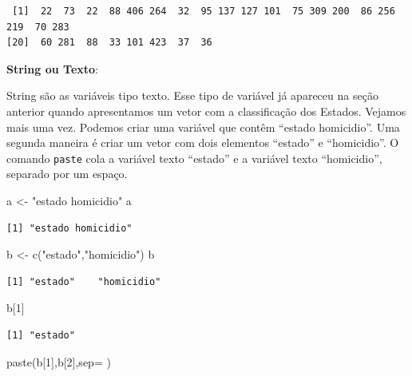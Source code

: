 \documentclass[
  letterpaper,
  DIV=11,
  numbers=noendperiod]{scrreprt}
\newenvironment{Shaded}{\begin{snugshade}}{\end{snugshade}}
\newcommand{\AttributeTok}[1]{\textcolor[rgb]{0.40,0.45,0.13}{#1}}
\newcommand{\DecValTok}[1]{\textcolor[rgb]{0.68,0.00,0.00}{#1}}
\newcommand{\FunctionTok}[1]{\textcolor[rgb]{0.28,0.35,0.67}{#1}}
\newcommand{\NormalTok}[1]{\textcolor[rgb]{0.00,0.23,0.31}{#1}}
\newcommand{\OtherTok}[1]{\textcolor[rgb]{0.00,0.23,0.31}{#1}}
\newcommand{\StringTok}[1]{\textcolor[rgb]{0.13,0.47,0.30}{#1}}
\begin{document}
\begin{verbatim}
 [1]  22  73  22  88 406 264  32  95 137 127 101  75 309 200  86 256 219  70 283
[20]  60 281  88  33 101 423  37  36
\end{verbatim}

\textbf{String ou Texto}:

String são as variáveis tipo texto. Esse tipo de variável já apareceu na
seção anterior quando apresentamos um vetor com a classificação dos
Estados. Vejamos mais uma vez. Podemos criar uma variável que contêm
``estado homicidio''. Uma segunda maneira é criar um vetor com dois
elementos ``estado'' e ``homicidio''. O comando \texttt{paste} cola a
variável texto ``estado'' e a variável texto ``homicidio'', separado por
um espaço.

\begin{Shaded}
\begin{Highlighting}[]
\NormalTok{a }\OtherTok{\textless{}{-}} \StringTok{"estado homicidio"}
\NormalTok{a}
\end{Highlighting}
\end{Shaded}

\begin{verbatim}
[1] "estado homicidio"
\end{verbatim}

\begin{Shaded}
\begin{Highlighting}[]
\NormalTok{b }\OtherTok{\textless{}{-}} \FunctionTok{c}\NormalTok{(}\StringTok{"estado"}\NormalTok{,}\StringTok{"homicidio"}\NormalTok{)}
\NormalTok{b}
\end{Highlighting}
\end{Shaded}

\begin{verbatim}
[1] "estado"    "homicidio"
\end{verbatim}

\begin{Shaded}
\begin{Highlighting}[]
\NormalTok{b[}\DecValTok{1}\NormalTok{]}
\end{Highlighting}
\end{Shaded}

\begin{verbatim}
[1] "estado"
\end{verbatim}

\begin{Shaded}
\begin{Highlighting}[]
\FunctionTok{paste}\NormalTok{(b[}\DecValTok{1}\NormalTok{],b[}\DecValTok{2}\NormalTok{],}\AttributeTok{sep=}\StringTok{\textquotesingle{} \textquotesingle{}}\NormalTok{)}
\end{Highlighting}
\end{Shaded}
\end{document}
